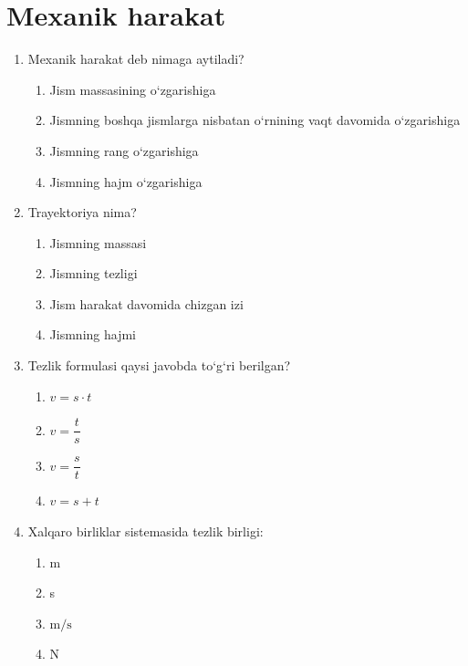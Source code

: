 \section{Mexanik harakat}

\begin{enumerate}[label=\textbf{\arabic*.}]

\item Mexanik harakat deb nimaga aytiladi?

\begin{enumerate}[label=\Alph*)]
    \item Jism massasining o‘zgarishiga
    \item Jismning boshqa jismlarga nisbatan o‘rnining vaqt davomida o‘zgarishiga
    \item Jismning rang o‘zgarishiga
    \item Jismning hajm o‘zgarishiga
\end{enumerate}



\item Trayektoriya nima?

\begin{enumerate}[label=\Alph*)]
    \item Jismning massasi
    \item Jismning tezligi
    \item Jism harakat davomida chizgan izi
    \item Jismning hajmi
\end{enumerate}



\item Tezlik formulasi qaysi javobda to‘g‘ri berilgan?

\begin{enumerate}[label=\Alph*)]
    \item $v = s \cdot t$
    \item $v = \dfrac{t}{s}$
    \item $v = \dfrac{s}{t}$
    \item $v = s + t$
\end{enumerate}



\item Xalqaro birliklar sistemasida tezlik birligi:

\begin{enumerate}[label=\Alph*)]
    \item m
    \item s
    \item $\text{m/s}$
    \item N
\end{enumerate}




\end{enumerate}
